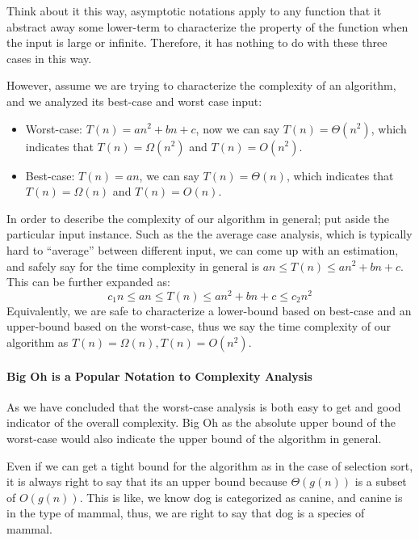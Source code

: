 \documentclass[../main.tex]{subfiles}
\begin{document}
Think about it this way, asymptotic notations apply to any function that it abstract away some lower-term to characterize the property of the function when the input is large or infinite. Therefore, it has nothing to do with these three cases in this way. 

However, assume we are trying to characterize the complexity of an algorithm, and we analyzed its best-case and worst case input:
\begin{itemize}
    \item Worst-case: $T(n)=an^2+bn+c$, now we can say $T(n)=\Theta(n^2)$, which indicates that $T(n)=\Omega(n^2)$ and $T(n)=O(n^2)$.
    \item Best-case: $T(n)=an$, we can say $T(n)=\Theta(n)$, which indicates that $T(n)=\Omega(n)$ and $T(n)=O(n)$.
\end{itemize}
In order to describe the complexity of our algorithm in general; put aside the particular input instance. Such as the the average case analysis, which is typically hard to ``average'' between different input, we can  come up with an estimation, and safely say for the time complexity in general is $an\leq T(n)\leq an^2+bn+c$. This can be further expanded as:
\begin{equation}
    c_1n\leq an\leq T(n)\leq an^2+bn+c \leq c_2n^2
\end{equation}
Equivalently, we are safe to characterize a lower-bound based on best-case and an upper-bound based on the worst-case, thus we say the time complexity of our algorithm as $T(n)=\Omega(n), T(n)=O(n^2)$. 


\paragraph{Big Oh is a Popular Notation to Complexity Analysis}
As we have concluded that the worst-case analysis is both easy to get and good indicator of the overall complexity. Big Oh as the absolute upper bound of the worst-case would also indicate the upper bound of the algorithm in general. 

Even if we can get a tight bound for the algorithm as in the case of selection sort, it is always right to say that its an upper bound because $\Theta(g(n))$ is a subset of $O(g(n))$. This is like, we know dog is categorized as canine, and canine is in the type of mammal, thus, we are right to say that dog is a species of mammal. 
\end{document}
